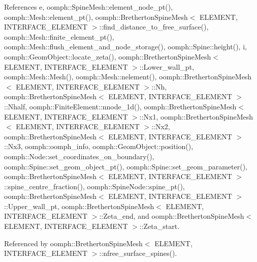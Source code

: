 References e, oomph\+::\+Spine\+Mesh\+::element\+\_\+node\+\_\+pt(), oomph\+::\+Mesh\+::element\+\_\+pt(), oomph\+::\+Bretherton\+Spine\+Mesh$<$ E\+L\+E\+M\+E\+N\+T, I\+N\+T\+E\+R\+F\+A\+C\+E\+\_\+\+E\+L\+E\+M\+E\+N\+T $>$\+::find\+\_\+distance\+\_\+to\+\_\+free\+\_\+surface(), oomph\+::\+Mesh\+::finite\+\_\+element\+\_\+pt(), oomph\+::\+Mesh\+::flush\+\_\+element\+\_\+and\+\_\+node\+\_\+storage(), oomph\+::\+Spine\+::height(), i, oomph\+::\+Geom\+Object\+::locate\+\_\+zeta(), oomph\+::\+Bretherton\+Spine\+Mesh$<$ E\+L\+E\+M\+E\+N\+T, I\+N\+T\+E\+R\+F\+A\+C\+E\+\_\+\+E\+L\+E\+M\+E\+N\+T $>$\+::\+Lower\+\_\+wall\+\_\+pt, oomph\+::\+Mesh\+::\+Mesh(), oomph\+::\+Mesh\+::nelement(), oomph\+::\+Bretherton\+Spine\+Mesh$<$ E\+L\+E\+M\+E\+N\+T, I\+N\+T\+E\+R\+F\+A\+C\+E\+\_\+\+E\+L\+E\+M\+E\+N\+T $>$\+::\+Nh, oomph\+::\+Bretherton\+Spine\+Mesh$<$ E\+L\+E\+M\+E\+N\+T, I\+N\+T\+E\+R\+F\+A\+C\+E\+\_\+\+E\+L\+E\+M\+E\+N\+T $>$\+::\+Nhalf, oomph\+::\+Finite\+Element\+::nnode\+\_\+1d(), oomph\+::\+Bretherton\+Spine\+Mesh$<$ E\+L\+E\+M\+E\+N\+T, I\+N\+T\+E\+R\+F\+A\+C\+E\+\_\+\+E\+L\+E\+M\+E\+N\+T $>$\+::\+Nx1, oomph\+::\+Bretherton\+Spine\+Mesh$<$ E\+L\+E\+M\+E\+N\+T, I\+N\+T\+E\+R\+F\+A\+C\+E\+\_\+\+E\+L\+E\+M\+E\+N\+T $>$\+::\+Nx2, oomph\+::\+Bretherton\+Spine\+Mesh$<$ E\+L\+E\+M\+E\+N\+T, I\+N\+T\+E\+R\+F\+A\+C\+E\+\_\+\+E\+L\+E\+M\+E\+N\+T $>$\+::\+Nx3, oomph\+::oomph\+\_\+info, oomph\+::\+Geom\+Object\+::position(), oomph\+::\+Node\+::set\+\_\+coordinates\+\_\+on\+\_\+boundary(), oomph\+::\+Spine\+::set\+\_\+geom\+\_\+object\+\_\+pt(), oomph\+::\+Spine\+::set\+\_\+geom\+\_\+parameter(), oomph\+::\+Bretherton\+Spine\+Mesh$<$ E\+L\+E\+M\+E\+N\+T, I\+N\+T\+E\+R\+F\+A\+C\+E\+\_\+\+E\+L\+E\+M\+E\+N\+T $>$\+::spine\+\_\+centre\+\_\+fraction(), oomph\+::\+Spine\+Node\+::spine\+\_\+pt(), oomph\+::\+Bretherton\+Spine\+Mesh$<$ E\+L\+E\+M\+E\+N\+T, I\+N\+T\+E\+R\+F\+A\+C\+E\+\_\+\+E\+L\+E\+M\+E\+N\+T $>$\+::\+Upper\+\_\+wall\+\_\+pt, oomph\+::\+Bretherton\+Spine\+Mesh$<$ E\+L\+E\+M\+E\+N\+T, I\+N\+T\+E\+R\+F\+A\+C\+E\+\_\+\+E\+L\+E\+M\+E\+N\+T $>$\+::\+Zeta\+\_\+end, and oomph\+::\+Bretherton\+Spine\+Mesh$<$ E\+L\+E\+M\+E\+N\+T, I\+N\+T\+E\+R\+F\+A\+C\+E\+\_\+\+E\+L\+E\+M\+E\+N\+T $>$\+::\+Zeta\+\_\+start.



Referenced by oomph\+::\+Bretherton\+Spine\+Mesh$<$ E\+L\+E\+M\+E\+N\+T, I\+N\+T\+E\+R\+F\+A\+C\+E\+\_\+\+E\+L\+E\+M\+E\+N\+T $>$\+::nfree\+\_\+surface\+\_\+spines().

\mbox{\label{classoomph_1_1BrethertonSpineMesh_a33c3ed5af92e7b22a22615f42c34c387}} 
